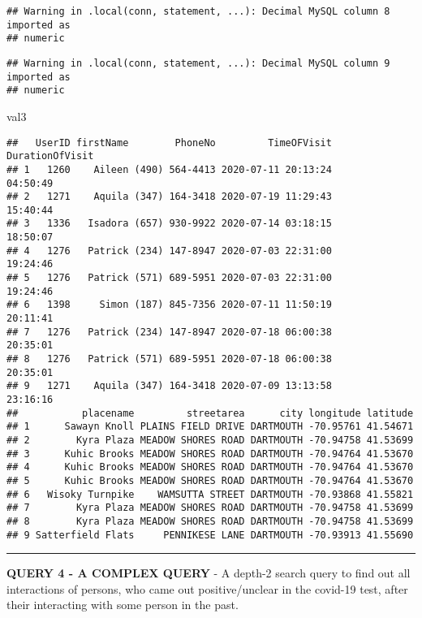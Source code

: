 \documentclass[
]{article}
\newenvironment{Shaded}{\begin{snugshade}}{\end{snugshade}}
\newcommand{\NormalTok}[1]{#1}
\begin{document}
\begin{verbatim}
## Warning in .local(conn, statement, ...): Decimal MySQL column 8 imported as
## numeric
\end{verbatim}

\begin{verbatim}
## Warning in .local(conn, statement, ...): Decimal MySQL column 9 imported as
## numeric
\end{verbatim}

\begin{Shaded}
\begin{Highlighting}[]
\NormalTok{val3}
\end{Highlighting}
\end{Shaded}

\begin{verbatim}
##   UserID firstName        PhoneNo         TimeOFVisit DurationOfVisit
## 1   1260    Aileen (490) 564-4413 2020-07-11 20:13:24        04:50:49
## 2   1271    Aquila (347) 164-3418 2020-07-19 11:29:43        15:40:44
## 3   1336   Isadora (657) 930-9922 2020-07-14 03:18:15        18:50:07
## 4   1276   Patrick (234) 147-8947 2020-07-03 22:31:00        19:24:46
## 5   1276   Patrick (571) 689-5951 2020-07-03 22:31:00        19:24:46
## 6   1398     Simon (187) 845-7356 2020-07-11 11:50:19        20:11:41
## 7   1276   Patrick (234) 147-8947 2020-07-18 06:00:38        20:35:01
## 8   1276   Patrick (571) 689-5951 2020-07-18 06:00:38        20:35:01
## 9   1271    Aquila (347) 164-3418 2020-07-09 13:13:58        23:16:16
##           placename         streetarea      city longitude latitude
## 1      Sawayn Knoll PLAINS FIELD DRIVE DARTMOUTH -70.95761 41.54671
## 2        Kyra Plaza MEADOW SHORES ROAD DARTMOUTH -70.94758 41.53699
## 3      Kuhic Brooks MEADOW SHORES ROAD DARTMOUTH -70.94764 41.53670
## 4      Kuhic Brooks MEADOW SHORES ROAD DARTMOUTH -70.94764 41.53670
## 5      Kuhic Brooks MEADOW SHORES ROAD DARTMOUTH -70.94764 41.53670
## 6   Wisoky Turnpike    WAMSUTTA STREET DARTMOUTH -70.93868 41.55821
## 7        Kyra Plaza MEADOW SHORES ROAD DARTMOUTH -70.94758 41.53699
## 8        Kyra Plaza MEADOW SHORES ROAD DARTMOUTH -70.94758 41.53699
## 9 Satterfield Flats     PENNIKESE LANE DARTMOUTH -70.93913 41.55690
\end{verbatim}

\begin{center}\rule{0.5\linewidth}{0.5pt}\end{center}

\textbf{QUERY 4 - A COMPLEX QUERY} - A depth-2 search query to find out
all interactions of persons, who came out positive/unclear in the
covid-19 test, after their interacting with some person in the past.
\end{document}
